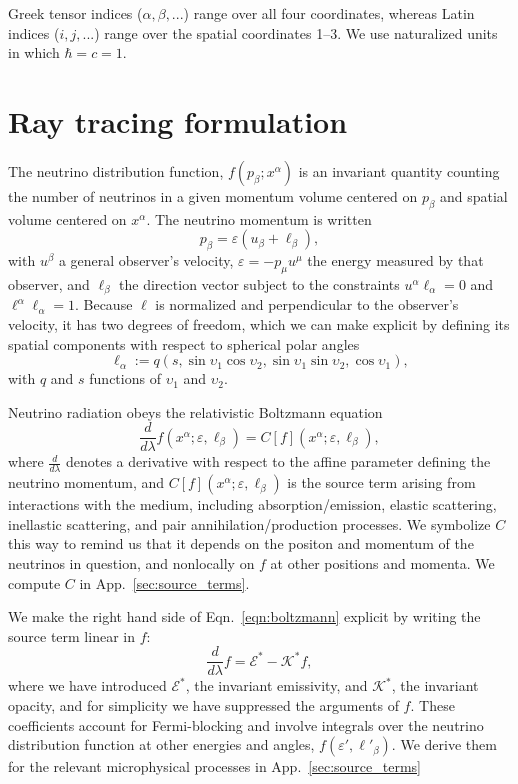 \documentclass[aps,prd,twocolumn,superscriptaddress,groupedaddress]{revtex4}
\begin{document}
Greek tensor indices ($\alpha, \beta, ...$) range over all four coordinates,
whereas Latin indices ($i, j, ...$) range over the spatial coordinates 1--3.
We use naturalized units in which $\hbar=c=1$.

\section{Ray tracing formulation}

The neutrino distribution function, $f(p_\beta; x^\alpha)$ is an invariant
quantity counting the number of neutrinos in a given momentum volume centered on
$p_\beta$ and spatial volume centered on $x^\alpha$.
The neutrino momentum is written
\begin{equation}
  \label{eqn:def_momentum}
  p_\beta = \varepsilon (u_\beta + \ell_\beta),
\end{equation}
with $u^\beta$ a general observer's velocity,
$\varepsilon=-p_\mu u^\mu$ the energy measured by that observer,
and $\ell_\beta$ the direction vector subject to the constraints
$u^\alpha \ell_\alpha = 0$ and
$\ell^\alpha \ell_\alpha=1$.
Because $\ell$ is normalized and perpendicular to the observer's velocity,
it has two degrees of freedom, which we can make explicit by defining its
spatial components with respect to spherical polar angles
\begin{equation}
  \label{eq:def_direction}
  \ell_\alpha :=
  q (s,\sin\upsilon_1\cos\upsilon_2,\sin\upsilon_1\sin\upsilon_2,\cos\upsilon_1),
\end{equation}
with $q$ and $s$ functions of $\upsilon_1$ and $\upsilon_2$.

Neutrino radiation obeys the relativistic Boltzmann equation
\begin{equation}
  \label{eqn:boltzmann}
  \frac{d}{d\lambda}f(x^\alpha;\varepsilon,\ell_\beta) =
  C[f](x^\alpha;\varepsilon,\ell_\beta),
\end{equation}
where $\frac{d}{d\lambda}$ denotes a derivative with respect to the affine
parameter defining the neutrino momentum,
and $C[f](x^\alpha;\varepsilon,\ell_\beta)$
is the source term arising from interactions with the medium,
including absorption/emission, elastic scattering, inellastic scattering,
and pair annihilation/production processes.
We symbolize $C$ this way to remind us that it depends on the positon and
momentum of the neutrinos in question, and nonlocally on $f$ at other positions
and momenta.
We compute $C$ in App.~\ref{sec:source_terms}.

We make the right hand side of Eqn.~\ref{eqn:boltzmann} explicit by writing
the source term linear in $f$:
\begin{equation}
  \label{eqn:boltzmann_linear}
  \frac{d}{d\lambda}f =
  \mathscr{E}^* - \mathscr{K}^* f,
\end{equation}
where we have introduced
$\mathscr{E}^*$, the invariant emissivity, and
$\mathscr{K}^*$, the invariant opacity, and for simplicity we have suppressed
the arguments of $f$.
These coefficients account for Fermi-blocking and involve integrals over the
neutrino distribution function at other energies and angles,
$f(\varepsilon', \ell'_\beta)$.
We derive them for the relevant microphysical processes in
App.~\ref{sec:source_terms}
\end{document}

